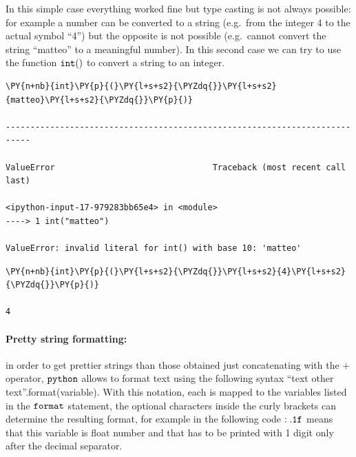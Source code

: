 In this simple case everything worked fine but type casting is not always possible: for example a number can be converted to a string (e.g.~from the integer 4 to the actual symbol ``4'') but the opposite is not possible (e.g.~cannot convert the string ``matteo'' to a meaningful number). In this second case we can try to use the function \(\tt{int()}\) to convert a string to an integer.

\begin{tcolorbox}[breakable, size=fbox, boxrule=1pt, pad at break*=1mm, colback=cellbackground, colframe=cellborder]            
\begin{Verbatim}[commandchars=\\\{\}]
\PY{n+nb}{int}\PY{p}{(}\PY{l+s+s2}{\PYZdq{}}\PY{l+s+s2}{matteo}\PY{l+s+s2}{\PYZdq{}}\PY{p}{)}

---------------------------------------------------------------------------

ValueError                                Traceback (most recent call last)

<ipython-input-17-979283bb65e4> in <module>
----> 1 int("matteo")  

ValueError: invalid literal for int() with base 10: 'matteo'
\end{Verbatim}
\end{tcolorbox}

\begin{tcolorbox}[breakable, size=fbox, boxrule=1pt, pad at break*=1mm, colback=cellbackground, colframe=cellborder]            
\begin{Verbatim}[commandchars=\\\{\}]
\PY{n+nb}{int}\PY{p}{(}\PY{l+s+s2}{\PYZdq{}}\PY{l+s+s2}{4}\PY{l+s+s2}{\PYZdq{}}\PY{p}{)}

4
\end{Verbatim}
\end{tcolorbox}

\paragraph{Pretty string formatting: } in order to get prettier strings than those obtained just concatenating with the + operator, \(\tt{python}\) allows to format text using the following syntax ``text {} other text''.format(variable).
With this notation, each {} is mapped to the variables listed in the $\tt{format}$ statement, the optional characters inside the curly brackets can determine the resulting format, for example in the following code $\tt{:.1f}$ means that this variable is float number and that has to be printed with 1 digit only after the decimal separator. 


